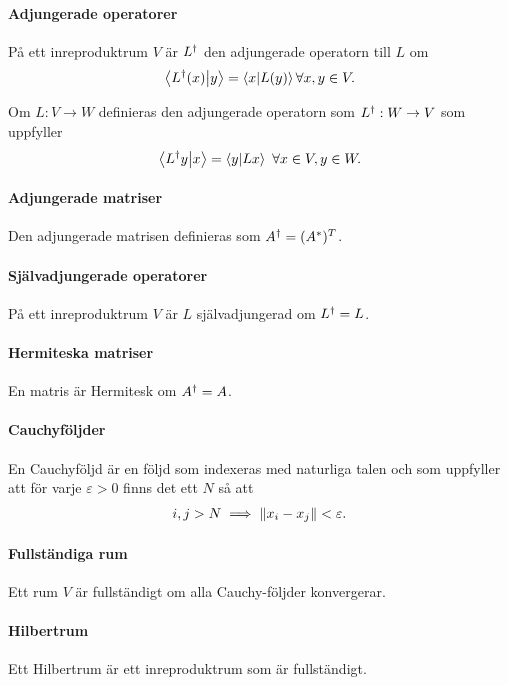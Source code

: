 \paragraph{Adjungerade operatorer}
På ett inreproduktrum $V$ är $L^{\dagger}$ den adjungerade operatorn till $L$ om
\begin{align*}
	\bra{L^{\dagger}(x)}\ket{y} = \bra{x}\ket{L(y)}\forall x, y\in V.
\end{align*}

Om $L: V\to W$ definieras den adjungerade operatorn som $L^{\dagger}: W\to V$ som uppfyller
\begin{align*}
	\bra{L^{\dagger}y}\ket{x} = \bra{y}\ket{Lx}\ \forall x\in V, y\in W.
\end{align*}

\paragraph{Adjungerade matriser}
Den adjungerade matrisen definieras som $A^{\dagger} = (A^{*})^{T}$.

\paragraph{Självadjungerade operatorer}
På ett inreproduktrum $V$ är $L$ självadjungerad om $L^{\dagger} = L$.

\paragraph{Hermiteska matriser}
En matris är Hermitesk om $A^{\dagger} = A$.

\paragraph{Cauchyföljder}
En Cauchyföljd är en följd som indexeras med naturliga talen och som uppfyller att för varje $\varepsilon > 0$ finns det ett $N$ så att
\begin{align*}
	i, j > N\implies \norm{x_{i} - x_{j}} < \varepsilon.
\end{align*}

\paragraph{Fullständiga rum}
Ett rum $V$ är fullständigt om alla Cauchy-följder konvergerar.

\paragraph{Hilbertrum}
Ett Hilbertrum är ett inreproduktrum som är fullständigt.

